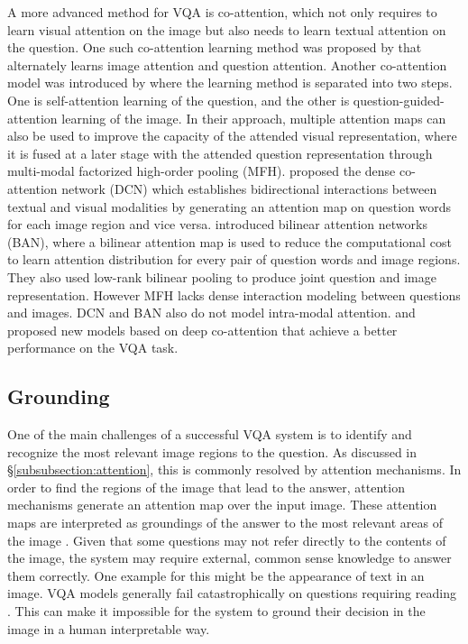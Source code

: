 \documentclass{article}
\begin{document}
A more advanced method for VQA is co-attention, which not only requires to learn visual attention on the image but also needs to learn textual attention on the question. One such co-attention learning method was proposed by \citet{lu2016hierarchical} that alternately learns image attention and question attention. 
Another co-attention model was introduced by \citet{yu2018beyond} where the learning method is separated into two steps. One is self-attention learning of the question, and the other is question-guided-attention learning of the image. In their approach, multiple attention maps can also be used to improve the capacity of the attended visual representation, where it is fused at a later stage with the attended question representation through multi-modal factorized high-order pooling (MFH).
\citet{Nguyen_2018_CVPR} proposed the dense co-attention network (DCN) which establishes bidirectional interactions between textual and visual modalities by generating an attention map on question words for each image region and vice versa. \citet{ban} introduced bilinear attention networks (BAN), where a bilinear attention map is used to reduce the computational cost to learn attention distribution for every pair of question words and image regions. They also used low-rank bilinear pooling to produce joint question and image representation. However MFH lacks dense interaction modeling between questions and images. DCN and BAN also do not model intra-modal attention. \citet{gao2019dynamic} and \citet{yu2019mcan} proposed new models based on deep co-attention that achieve a better performance on the VQA task. %

\subsection{Grounding}

One of the main challenges of a successful VQA system is to identify and recognize the most relevant image regions to the question. As discussed in \S \ref{subsubsection:attention}, this is commonly resolved by attention mechanisms. In order to find the regions of the image that lead to the answer, attention mechanisms generate an attention map over the input image. These attention maps are interpreted as groundings of the answer to the most relevant areas of the image \citep{zhang2019interpretable}. Given that some questions may not refer directly to the contents of the image, the system may require external, common sense knowledge to answer them correctly.
One example for this might be the appearance of text in an image. VQA models generally fail catastrophically on questions requiring reading \citep{singh2019towards}. %
This can make it impossible for the system to ground their decision in the image in a human interpretable way.
\end{document}
